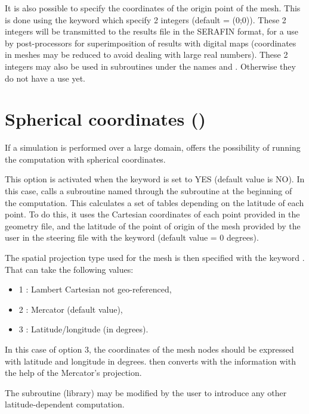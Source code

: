 It is also possible to specify the coordinates of the origin point of the mesh.
This is done using the keyword  which specify 2
integers (default = (0;0)).
These 2 integers will be transmitted to the results file in the
SERAFIN format, for a use by post-processors for superimposition of results
with digital maps (coordinates in meshes may be reduced to avoid dealing with
large real numbers). These 2 integers may also be used in subroutines under the
names  and . Otherwise they do not have a use yet.


\section{Spherical coordinates ()}

If a simulation is performed over a large domain,  offers the
possibility of running the computation with spherical coordinates.

This option is activated when the keyword  is set
to YES (default value is NO). In this case,  calls a subroutine named
 through the subroutine  at the beginning of the
computation. This calculates a set of tables depending on the latitude of each
point. To do this, it uses the Cartesian coordinates of each point provided in
the geometry file, and the latitude of the point of origin of the mesh provided
by the user in the steering file with the keyword
 (default value = 0 degrees).

The spatial projection type used for the mesh is then specified with the
keyword . That can take the following values:
\begin{itemize}
\item 1 : Lambert Cartesian not geo-referenced,

\item 2 : Mercator (default value),

\item 3 : Latitude/longitude (in degrees).
\end{itemize}

In this case of option 3, the coordinates of the mesh nodes should be
expressed with latitude and longitude in degrees.  then converts with
the information with the help of the Mercator's projection.

The  subroutine (\bief library) may be modified by the user to introduce
any other latitude-dependent computation.


